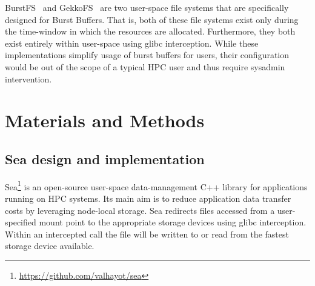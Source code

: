       BurstFS~\cite{burstfs} and GekkoFS~\cite{gekkofs} are two user-space file
      systems that are specifically designed for Burst Buffers. That is, both of
      these file systems exist only during the time-window in which the
      resources are allocated. Furthermore, they both exist entirely within
      user-space using glibc interception. While these implementations simplify
      usage of burst buffers for users, their configuration would be out of the
      scope of a typical HPC user and thus require sysadmin intervention.

\section{Materials and Methods}

\subsection{Sea design and implementation}

Sea\footnote{\url{https://github.com/valhayot/sea}} is an open-source user-space
data-management C++ library for applications running on HPC systems. Its main
aim is to reduce application data transfer costs by leveraging node-local
storage. Sea redirects files accessed from a user-specified mount point to the
appropriate storage devices using glibc interception. Within an intercepted call
the file will be written to or read from the fastest storage device available. 


